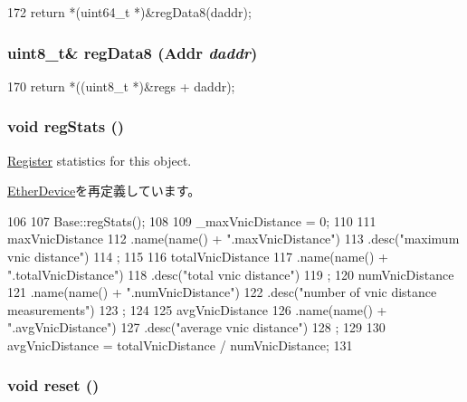 \begin{DoxyCode}
172 { return *(uint64_t *)&regData8(daddr); }
\end{DoxyCode}
\hypertarget{classSinic_1_1Device_ab9d3fc8abcb0bc9a41665d6311d64106}{
\subsubsection[{regData8}]{\setlength{\rightskip}{0pt plus 5cm}uint8\_\-t\& regData8 ({\bf Addr} {\em daddr})}}
\label{classSinic_1_1Device_ab9d3fc8abcb0bc9a41665d6311d64106}



\begin{DoxyCode}
170 { return *((uint8_t *)&regs + daddr); }
\end{DoxyCode}
\hypertarget{classSinic_1_1Device_a4dc637449366fcdfc4e764cdf12d9b11}{
\subsubsection[{regStats}]{\setlength{\rightskip}{0pt plus 5cm}void regStats ()}}
\label{classSinic_1_1Device_a4dc637449366fcdfc4e764cdf12d9b11}
\hyperlink{classRegister}{Register} statistics for this object. 

\hyperlink{classEtherDevice_a4dc637449366fcdfc4e764cdf12d9b11}{EtherDevice}を再定義しています。


\begin{DoxyCode}
106 {
107     Base::regStats();
108 
109     _maxVnicDistance = 0;
110 
111     maxVnicDistance
112         .name(name() + ".maxVnicDistance")
113         .desc("maximum vnic distance")
114         ;
115 
116     totalVnicDistance
117         .name(name() + ".totalVnicDistance")
118         .desc("total vnic distance")
119         ;
120     numVnicDistance
121         .name(name() + ".numVnicDistance")
122         .desc("number of vnic distance measurements")
123         ;
124 
125     avgVnicDistance
126         .name(name() + ".avgVnicDistance")
127         .desc("average vnic distance")
128         ;
129 
130     avgVnicDistance = totalVnicDistance / numVnicDistance;
131 }
\end{DoxyCode}
\hypertarget{classSinic_1_1Device_ad20897c5c8bd47f5d4005989bead0e55}{
\subsubsection[{reset}]{\setlength{\rightskip}{0pt plus 5cm}void reset ()}}
\label{classSinic_1_1Device_ad20897c5c8bd47f5d4005989bead0e55}



